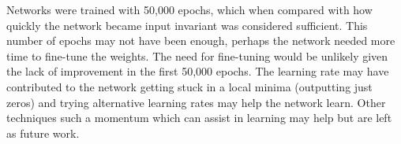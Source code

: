 Networks were trained with 50,000 epochs, which when compared with how quickly the network became input invariant was considered sufficient.
This number of epochs may not have been enough, perhaps the network needed more time to fine-tune the weights. 
The need for fine-tuning would be unlikely given the lack of improvement in the first 50,000 epochs. 
The learning rate may have contributed to the network getting stuck in a local minima (outputting just zeros) and trying alternative learning rates may help the network learn.
Other techniques such a momentum \cite{sutskever2013importance} which can assist in learning may help but are left as future work.






























